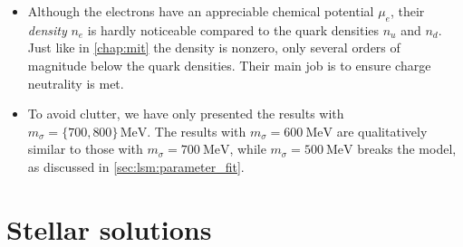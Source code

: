 \begin{itemize}
\item Although the electrons have an appreciable chemical potential $\mu_e$, their \emph{density} $n_e$ is hardly noticeable compared to the quark densities $n_u$ and $n_d$.
      Just like in \cref{chap:mit} the density is nonzero, only several orders of magnitude below the quark densities.
      Their main job is to ensure charge neutrality is met.
\item To avoid clutter, we have only presented the results with $m_\sigma=\{700,800\}\,\si{\mega\electronvolt}$.
      The results with 
      $m_\sigma=\SI{600}{\mega\electronvolt}$ 
      are qualitatively similar to those with 
      $m_\sigma=\SI{700}{\mega\electronvolt}$,
      while
      $m_\sigma=\SI{500}{\mega\electronvolt}$ breaks the model,
      as discussed in \cref{sec:lsm:parameter_fit}.
\end{itemize}


\section{Stellar solutions}


